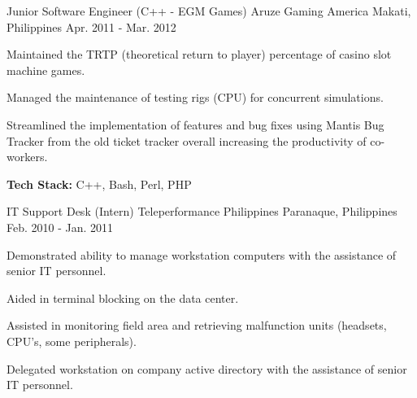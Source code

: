 \begin{cventries}
    \cventry
        {Junior Software Engineer (C++ - EGM Games)}
        {Aruze Gaming America}
        {Makati, Philippines}
        {Apr. 2011 - Mar. 2012}
        {
            \begin{cvitems}
                \item
                    {Maintained the TRTP (theoretical return to player) percentage of casino slot machine games.}
                \item 
                    {Managed the maintenance of testing rigs (CPU) for concurrent simulations.}
                \item
                    {Streamlined the implementation of features and bug fixes using Mantis Bug Tracker from the old ticket tracker overall increasing the productivity of co-workers.}
                \item 
                    {\textbf{Tech Stack:} C++, Bash, Perl, PHP}               
            \end{cvitems}
        }

    \cventry
        {IT Support Desk (Intern)}
        {Teleperformance Philippines}
        {Paranaque, Philippines}
        {Feb. 2010 - Jan. 2011}
        {
            \begin{cvitems}
                \item
                    {Demonstrated ability to manage workstation computers with the assistance of senior IT personnel.}
                \item 
                    {Aided in terminal blocking on the data center.}
                \item 
                    {Assisted in monitoring field area and retrieving malfunction units (headsets, CPU’s, some peripherals).}
                \item
                    {Delegated workstation on company active directory with the assistance of senior IT personnel.}
            \end{cvitems}        
        }

\end{cventries}
